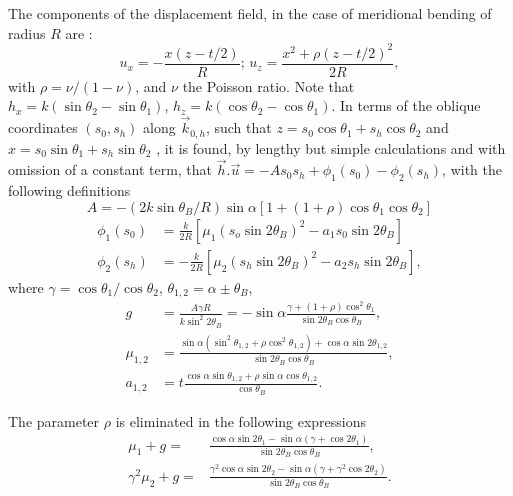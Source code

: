 \documentclass[preprint]{iucr}              %
\begin{document}
The components of the displacement field, in the case of meridional bending of radius $R$ are \cite{Nesterets}:
\begin{equation}
    u_x = -\frac{x(z-t/2)}{R}; \, u_z=\frac{x^2+\rho(z-t/2)^2}{2R},
\end{equation}
with $\rho=\nu/(1-\nu)$, and $\nu$ the Poisson ratio. 
Note that $h_x=k(\sin\theta_2-\sin\theta_1)$, $h_z=k(\cos\theta_2-\cos\theta_1)$.
In terms of the oblique coordinates $(s_0,s_h)$ along $\vec k_{0,h}$, such that $z=s_0\cos\theta_1 + s_h \cos\theta_2$ and $x=s_0 \sin\theta_1+s_h\sin\theta_2$ , 
it is found, by lengthy but simple calculations and with omission of a constant term, that $\vec h.\vec u=-A s_0 s_h + \phi_1(s_0) -\phi_2(s_h)$,  
with the following definitions
\begin{equation}
    A = -(2 k \sin\theta_B /R)\sin\alpha[1+(1+\rho)\cos\theta_1\cos\theta_2]
\end{equation}
\begin{align}
    \phi_1(s_0) &= \frac{k}{2R}[\mu_1(s_o\sin2\theta_B)^2-a_1 s_0\sin2\theta_B] \nonumber \\
    \phi_2(s_h) &= -\frac{k}{2R}[\mu_2(s_h\sin2\theta_B)^2-a_2 s_h\sin2\theta_B],
\end{align}
where $\gamma=\cos\theta_1/\cos\theta_2$, $\theta_{1,2}=\alpha\pm \theta_B$,
\begin{align}
   g &= \frac{A \gamma R}{k \sin^2 2\theta_B} = -\sin\alpha\frac{\gamma +(1+\rho)\cos^2\theta_1}{\sin2\theta_B\cos\theta_B}, \nonumber \\
   \mu_{1,2} &=\frac{\sin\alpha(\sin^2\theta_{1,2}+\rho\cos^2\theta_{1,2})+\cos\alpha\sin2\theta_{1,2}}{\sin2\theta_B\cos\theta_B}, \nonumber \\
   a_{1,2} &=t\frac{\cos\alpha\sin\theta_{1,2}+\rho\sin\alpha\cos\theta_{1,2}}{\cos\theta_B}. \nonumber
\end{align}


The parameter $\rho$ is eliminated in the following expressions 
\begin{align}
    \mu_1+g=&\frac{\cos\alpha\sin2\theta_1-\sin\alpha(\gamma+\cos2\theta_1)}{\sin2\theta_B\cos\theta_B},
    \\
    \gamma^2\mu_2+g=&\frac{\gamma^2\cos\alpha\sin2\theta_2-\sin\alpha(\gamma+\gamma^2\cos2\theta_2)}{\sin2\theta_B\cos\theta_B}.
\end{align}
\end{document}
